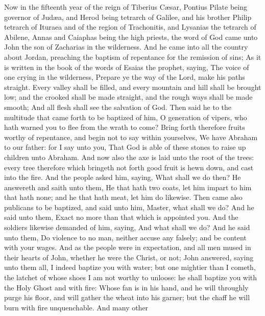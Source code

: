  Now in the fifteenth year of the reign of Tiberius Cæsar,
Pontius Pilate being governor of Judæa, and Herod being tetrarch of
Galilee, and his brother Philip tetrarch of Ituraea and of the region of
Trachonitis, and Lysanias the tetrarch of Abilene,  Annas
and Caiaphas being the high priests, the word of God came unto John the
son of Zacharias in the wilderness.  And he came into all
the country about Jordan, preaching the baptism of repentance for the
remission of sins;  As it is written in the book of the
words of Esaias the prophet, saying, The voice of one crying in the
wilderness, Prepare ye the way of the Lord, make his paths straight.
 Every valley shall be filled, and every mountain and hill
shall be brought low; and the crooked shall be made straight, and the
rough ways shall be made smooth;  And all flesh shall see
the salvation of God.  Then said he to the multitude that
came forth to be baptized of him, O generation of vipers, who hath
warned you to flee from the wrath to come?  Bring forth
therefore fruits worthy of repentance, and begin not to say within
yourselves, We have Abraham to our father: for I say unto you, That God
is able of these stones to raise up children unto Abraham. 
And now also the axe is laid unto the root of the trees: every tree
therefore which bringeth not forth good fruit is hewn down, and cast
into the fire.  And the people asked him, saying, What
shall we do then?  He answereth and saith unto them, He
that hath two coats, let him impart to him that hath none; and he that
hath meat, let him do likewise.  Then came also publicans
to be baptized, and said unto him, Master, what shall we do?
 And he said unto them, Exact no more than that which is
appointed you.  And the soldiers likewise demanded of him,
saying, And what shall we do? And he said unto them, Do violence to no
man, neither accuse any falsely; and be content with your wages.
 And as the people were in expectation, and all men mused
in their hearts of John, whether he were the Christ, or not;
 John answered, saying unto them all, I indeed baptize you
with water; but one mightier than I cometh, the latchet of whose shoes I
am not worthy to unloose: he shall baptize you with the Holy Ghost and
with fire:  Whose fan is in his hand, and he will throughly
purge his floor, and will gather the wheat into his garner; but the
chaff he will burn with fire unquenchable.  And many other

